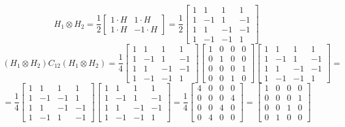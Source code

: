 \documentclass{../notatki}
\begin{document}
$$
H_1 \otimes H_2 = \frac{1}{2}
\begin{bmatrix}
  1 \cdot H & 1 \cdot H \\
  1 \cdot H & -1 \cdot H
\end{bmatrix} = \frac{1}{2}
\begin{bmatrix}
  1 & 1 & 1 & 1 \\
  1 & -1 & 1 & -1 \\
  1 & 1 & -1 & -1 \\
  1 & -1 & -1 & 1
\end{bmatrix}
$$
$$
(H_1 \otimes H_2)C_{12}(H_1 \otimes H_2) = \frac{1}{4}
\begin{bmatrix}
  1 & 1 & 1 & 1 \\
  1 & -1 & 1 & -1 \\
  1 & 1 & -1 & -1 \\
  1 & -1 & -1 & 1
\end{bmatrix}
\begin{bmatrix}
  1 & 0 & 0 & 0 \\
  0 & 1 & 0 & 0 \\
  0 & 0 & 0 & 1 \\
  0 & 0 & 1 & 0
\end{bmatrix}
\begin{bmatrix}
  1 & 1 & 1 & 1 \\
  1 & -1 & 1 & -1 \\
  1 & 1 & -1 & -1 \\
  1 & -1 & -1 & 1
\end{bmatrix}
=
$$
$$
=
\frac{1}{4}
\begin{bmatrix}
  1 & 1 & 1 & 1 \\
  1 & -1 & -1 & 1 \\
  1 & 1 & -1 & -1 \\
  1 & -1 & 1 & -1
\end{bmatrix}
\begin{bmatrix}
  1 & 1 & 1 & 1 \\
  1 & -1 & 1 & -1 \\
  1 & 1 & -1 & -1 \\
  1 & -1 & -1 & 1
\end{bmatrix}
=
\frac{1}{4}
\begin{bmatrix}
  4 & 0 & 0 & 0 \\
  0 & 0 & 0 & 4 \\
  0 & 0 & 4 & 0 \\
  0 & 4 & 0 & 0
\end{bmatrix} =
\begin{bmatrix}
  1 & 0 & 0 & 0 \\
  0 & 0 & 0 & 1 \\
  0 & 0 & 1 & 0 \\
  0 & 1 & 0 & 0
\end{bmatrix}
$$
\end{document}
